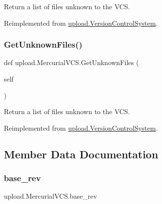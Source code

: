 \begin{DoxyVerb}Return a list of files unknown to the VCS.\end{DoxyVerb}
 

Reimplemented from \mbox{\hyperlink{classupload_1_1_version_control_system_a56a60e56aa9aff3df4001d2f84cab884}{upload.\+Version\+Control\+System}}.

\mbox{\label{classupload_1_1_mercurial_v_c_s_a6190899fb86cd09ad84cc5d4b0ebd2f3}} 
\subsubsection{\texorpdfstring{GetUnknownFiles()}{GetUnknownFiles()}\hspace{0.1cm}{\footnotesize\ttfamily [2/2]}}
{\footnotesize\ttfamily def upload.\+Mercurial\+V\+C\+S.\+Get\+Unknown\+Files (\begin{DoxyParamCaption}\item[{}]{self }\end{DoxyParamCaption})}

\begin{DoxyVerb}Return a list of files unknown to the VCS.\end{DoxyVerb}
 

Reimplemented from \mbox{\hyperlink{classupload_1_1_version_control_system_a56a60e56aa9aff3df4001d2f84cab884}{upload.\+Version\+Control\+System}}.



\subsection{Member Data Documentation}
\mbox{\label{classupload_1_1_mercurial_v_c_s_a41faae7820d5a015f4a42476e5e4ab8c}} 
\subsubsection{\texorpdfstring{base\_rev}{base\_rev}}
{\footnotesize\ttfamily upload.\+Mercurial\+V\+C\+S.\+base\+\_\+rev}

\mbox{\label{classupload_1_1_mercurial_v_c_s_a219c1e0ab9ce864e3231913762ea489b}} 
